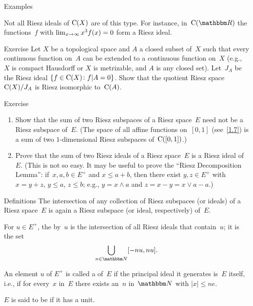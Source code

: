 \documentclass[main.tex]{subfiles}
\begin{document}
\begin{psec}{2.8}{Examples}
\begin{enumerate}
Not all Riesz ideals of $\mathrm{C}(X)$ are of this type.
For instance,
in~$\Cont{\R}$ the functions~$f$
with $\lim_{x\rightarrow \infty} x^3 f(x)=0$
form a Riesz ideal.
\end{enumerate}
\end{psec}
%
%
\begin{psec}{2.9}{Exercise}
Let $X$ be a topological space
and $A$ a closed subset of~$X$ 
such that every continuous function on~$A$
can be extended to a continuous function on~$X$ 
(e.g., $X$ is compact Hausdorff or $X$ is metrizable,
and $A$ is any closed set).
Let~$J_A$ be the Riesz ideal
$\{f\in\mathrm{C}(X)\colon f|A=0\}$.
Show that the quotient Riesz space
$\mathrm{C}(X)/J_A$ is Riesz isomorphic to~$\mathrm{C}(A)$.
\end{psec}
%
%
\begin{psec}{2.10}{Exercise}
\begin{enumerate}
\item \label{2.10-1}
Show that the sum of two Riesz subspaces 
of a Riesz space~$E$ need not be a Riesz subspace of~$E$.
(The space of all affine functions on~$[0,1]$ (see~\ref{1.7})
is a sum of two $1$-dimensional Riesz subspaces of~$\mathrm{C}([0,1])$.)
%
\item \label{2.10-2}
Prove that the sum of two Riesz ideals
of a Riesz space~$E$
is a Riesz ideal of~$E$.
(This is not so easy.
It may be useful to prove
the ``Riesz Decomposition Lemma'':
if~$x,a,b\in E^+$ and $x\leq a+b$,
then there exist $y,z\in E^+$ 
with $x=y+z$, $y\leq a$, $z\leq b$;
e.g., $y=x\wedge a$ and $z=x-y=x\vee a-a$.)
\end{enumerate}
\end{psec}
%
%
\begin{psec}{2.11}{Definitions}
The intersection of any collection of Riesz subspaces
(or ideals) of a Riesz space~$E$ 
is again a Riesz subspace
(or ideal, respectively)
of~$E$.

For $u\in E^+$, 
the  by~$u$ 
is the intersection of all Riesz ideals
that contain~$u$;
it is the set
\begin{equation*}
\bigcup_{n\in\N} [-nu,nu]
\htam{.}
\end{equation*}

An element $u$ of $E^+$
is called 
a  of~$E$
if the principal ideal it generates is~$E$ itself,
i.e., 
if for every~$x$ in~$E$
there exists an~$n$ in~$\N$ with $|x|\leq ne$.

$E$ is said to be  if it has a unit.
\end{psec}
\end{document}
